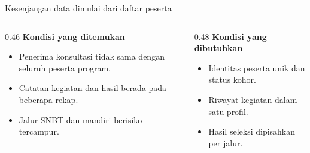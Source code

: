 \begin{frame}{Kesenjangan data dimulai dari daftar peserta}
  \begin{columns}[T,onlytextwidth]
    \begin{column}{0.46\textwidth}
      {\color{StudentBlue}\bfseries Kondisi yang ditemukan}\par
      \begin{itemize}
        \item Penerima konsultasi tidak sama dengan seluruh peserta program.
        \item Catatan kegiatan dan hasil berada pada beberapa rekap.
        \item Jalur SNBT dan mandiri berisiko tercampur.
      \end{itemize}
    \end{column}
    \begin{column}{0.48\textwidth}
      {\color{StudentBlue}\bfseries Kondisi yang dibutuhkan}\par
      \begin{itemize}
        \item Identitas peserta unik dan status kohor.
        \item Riwayat kegiatan dalam satu profil.
        \item Hasil seleksi dipisahkan per jalur.
      \end{itemize}
    \end{column}
  \end{columns}
  \vspace{0.16cm}
\end{frame}

